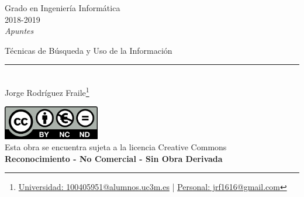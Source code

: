 \documentclass[12pt, twoside, openright]{report} %
\begin{document}
	
\begin{titlepage}
	\begin{sffamily}
	\color{azulUC3M}
	\begin{center}
		\begin{figure}[H] %
		\end{figure}
		\vspace{2.5cm}
		\begin{Large}
			Grado en Ingeniería Informática\\			
			2018-2019\\
			\vspace{2cm}		
			\textsl{Apuntes}\\
			\bigskip
		\end{Large}
		 	{\Huge Técnicas de Búsqueda y Uso de la Información}\\
		 	\vspace*{0.5cm}
	 		\rule{10.5cm}{0.1mm}\\
			\vspace*{0.9cm}
			{\LARGE Jorge Rodríguez Fraile\footnote{\href{mailto:100405951@alumnos.uc3m.es}{Universidad: 100405951@alumnos.uc3m.es}  |  \href{mailto:jrf1616@gmail.com}{Personal: jrf1616@gmail.com}}}\\ 
			\vspace*{1cm}
	\end{center}
	\vfill
	\color{black}
		\includegraphics[width=4.2cm]{img/creativecommons.png}\\
		Esta obra se encuentra sujeta a la licencia Creative Commons\\ \textbf{Reconocimiento - No Comercial - Sin Obra Derivada}
	\end{sffamily}
\end{titlepage}


\tableofcontents
\thispagestyle{fancy}
\end{document}
